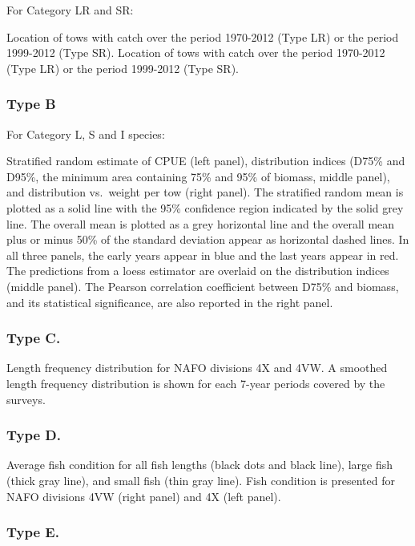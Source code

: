 \documentclass[12pt]{article}\usepackage[]{graphicx}\usepackage[]{color}
\begin{document}
For Category LR and SR:

Location of tows with catch over the period 1970-2012 (Type LR) or the period 1999-2012 (Type SR). Location of tows with catch over the period 1970-2012 (Type LR) or the period 1999-2012 (Type SR).

\subsubsection{Type B}\label{type-b}

For Category L, S and I species:

Stratified random estimate of CPUE (left panel), distribution indices (D75\% and D95\%, the minimum area containing 75\% and 95\% of biomass, middle panel), and distribution vs.~weight per tow (right panel). The stratified random mean is plotted as a solid line with the 95\% confidence region indicated by the solid grey line. The overall mean is plotted as a grey horizontal line and the overall mean plus or minus 50\% of the standard deviation appear as horizontal dashed lines. In all three panels, the early years appear in blue and the last years appear in red. The predictions from a loess estimator are overlaid on the distribution indices (middle panel). The Pearson correlation coeﬃcient between D75\% and biomass, and its statistical significance, are also reported in the right panel.

\subsubsection{Type C.}\label{type-c.}

Length frequency distribution for NAFO divisions 4X and 4VW. A smoothed length frequency distribution is shown for each 7-year periods covered by the surveys.

\subsubsection{Type D.}\label{type-d.}

Average fish condition for all fish lengths (black dots and black line), large fish (thick gray line), and small fish (thin gray line). Fish condition is presented for NAFO divisions 4VW (right panel) and 4X (left panel).

\subsubsection{Type E.}\label{type-e.}
\end{document}
